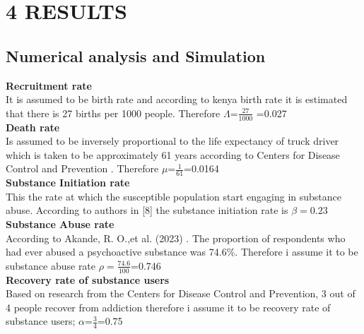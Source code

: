 \documentclass[12pt]{report}
\begin{document}
\chapter{4 RESULTS}
\section{Numerical analysis and Simulation}
\textbf{Recruitment rate}\\
It is assumed to be birth rate  and according to kenya birth rate it is estimated that there is 27 births per 1000 people. Therefore $\Lambda $=$\frac{27}{1000}$ =0.027 \\
\textbf{Death rate }\\
Is assumed to be inversely 
proportional to the life expectancy of truck driver which is taken to be approximately 61 years according to Centers for Disease Control and Prevention . Therefore $\mu$=$\frac{1}{61}$=0.0164\\
\textbf{Substance Initiation rate}\\
This the rate at which the susceptible population start engaging in substance abuse. According to authors in [8] the substance initiation rate is $\beta = 0.23$ \\ 
 \textbf{Substance Abuse rate}\\
 According to Akande, R. O.,et al. (2023) . The proportion of respondents who had ever abused a psychoactive substance was 74.6\%. Therefore i assume it to be substance abuse rate $\rho = \frac{74.6}{100}$=0.746\\
 \textbf{Recovery rate of substance users}\\
Based on research from the Centers for Disease Control and Prevention, 3 out of 4 people  recover from addiction therefore i assume it to be recovery rate of substance users;  $\alpha$=$\frac{3}{4}$=0.75
\newpage
\end{document}

